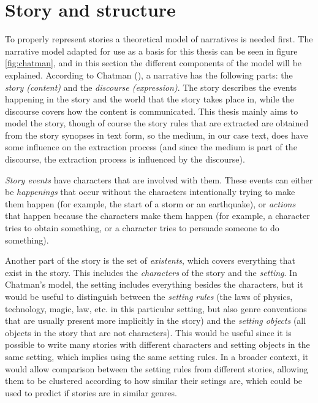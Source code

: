 \section{Story and structure}

To properly represent stories a theoretical model of narratives is needed first.
The narrative model adapted for use as a basis for this thesis can be seen in figure \ref{fig:chatman}, and in this
section the different components of the model will be explained.
According to Chatman (\cite{chatman1980story}), a narrative has the following
parts: the
\emph{story (content)} and the \emph{discourse (expression)}. The story describes the events
happening in the story and the world that the story takes place in, while the
discourse covers how the content is communicated.
This thesis mainly aims to model the story, though of course the story rules that are
extracted are obtained from the story synopses in text form, so the medium, in
our case text, does have some influence on the extraction process (and since the
medium is part of the discourse, the extraction process is influenced by the
discourse).

\emph{Story events} have characters that are involved with them. These events
can either be \emph{happenings} that occur without the characters intentionally trying to
make them happen (for example, the start of a storm or an earthquake), or
\emph{actions}
that happen because the characters make them happen (for example, a character
tries to obtain something, or a character tries to persuade someone to do
something).

Another part of the story is the set of \emph{existents}, which covers
everything that exist in
the story. This includes the \emph{characters} of the story and the
\emph{setting}. In Chatman's model, the setting includes everything besides the
characters, but it
would be useful to distinguish between the \emph{setting rules} (the laws of
physics, technology, magic, law, etc. in this particular setting, but also genre
conventions that are usually present more implicitly in the story) and the \emph{setting objects} (all
objects in the story that are not characters). This would be useful since it is possible to write
many stories with different characters and setting objects in the same setting,
which implies using the same setting rules. In a broader context, it would allow
comparison between the setting rules from different stories, allowing them to be
clustered according to how similar their setings are, which could be used to
predict if stories are in similar genres.

